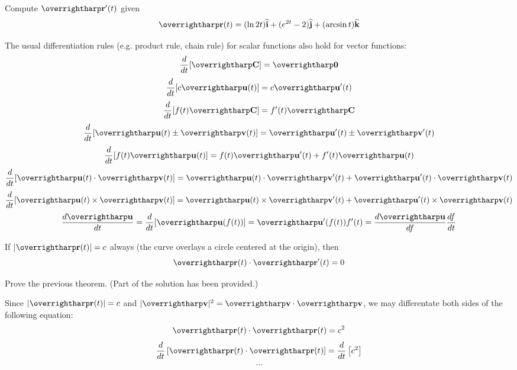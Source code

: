 \documentclass[letterpaper, twoside, 12pt]{book}
\begin{document}
          \begin{problem}
            Compute $\vect{r}'(t)$ given
            \[
              \vect{r}(t)
                =
              (\ln 2t)\veci + (e^{2t}-2)\vecj + (\arcsin t)\veck
            \]
          \end{problem}

          \begin{solution}

          \end{solution}



\begin{theorem}
  The usual differentiation rules (e.g. product rule, chain rule) for scalar
  functions also hold for vector functions:
  \[\frac{d}{dt} [\vect{C}] = \vect{0}\]
  \[\frac{d}{dt} [c\vect{u}(t)] = c\vect{u}'(t)\]
  \[\frac{d}{dt} [f(t)\vect{C}] = f'(t)\vect{C}\]
  \[\frac{d}{dt} [\vect{u}(t) \pm \vect{v}(t)] = \vect{u}'(t) \pm \vect{v}'(t)\]
  \[\frac{d}{dt} [f(t)\vect{u}(t)] = f(t)\vect{u}'(t) + f'(t)\vect{u}(t)\]
  \[\frac{d}{dt} [\vect{u}(t) \cdot \vect{v}(t)] = \vect{u}(t)\cdot\vect{v}'(t) + \vect{u}'(t)\cdot\vect{v}(t)\]
  \[\frac{d}{dt} [\vect{u}(t) \times \vect{v}(t)] = \vect{u}(t)\times\vect{v}'(t) + \vect{u}'(t)\times\vect{v}(t)\]
  \[\frac{d\vect{u}}{dt} = \frac{d}{dt} [\vect{u}(f(t))] =\vect{u}'(f(t))f'(t) = \frac{d\vect{u}}{df}\frac{df}{dt}\]
\end{theorem}

\begin{theorem}
If $|\vect{r}(t)|=c$ always (the curve overlays a circle centered at
the origin), then \[\vect{r}(t) \cdot \vect{r}'(t) = 0\]
\end{theorem}

          \begin{problem}
            Prove the previous theorem. (Part of the solution has been
            provided.)
          \end{problem}

          \begin{solution}
            Since $|\vect{r}(t)|=c$ and
            $|\vect{v}|^2=\vect{v}\cdot\vect{v}$, we may differentate
            both sides of the following equation:
            \[
              \vect{r}(t)\cdot\vect{r}(t)=c^2
            \]
            \[
              \frac{d}{dt}\left[\vect{r}(t)\cdot\vect{r}(t)\right]
              =
              \frac{d}{dt}\left[c^2\right]
            \]
            \[
              \dots
            \]
          \end{solution}
\end{document}
